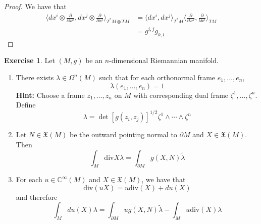 \documentclass{book}
\theoremstyle{definition}
\newtheorem{ex}[definition]{Exercise}
\newcommand{\ze}{\zeta}
\newcommand{\lam}{\lambda}
\newcommand{\Om}{\Omega}
\newcommand{\C}{\mathbb{C}}
\newcommand{\MFX}{\mathfrak{X}}
\DeclareMathOperator*{\0}{\mbf{0}}
\DeclareMathOperator*{\1}{\mbf{1}}
\renewcommand{\r}{\rangle}
\renewcommand{\l}{\langle}
\renewcommand{\div}{\text{div}}
\newcommand{\tbf}[1]{\textbf{#1}}
\newcommand{\p}{\partial}
\begin{document}
	\begin{proof}
		We have that 
		\begin{align*}
			\bigg \l dx^i \otimes \frac{\p }{\p x^k}, dx^j \otimes \frac{\p}{\p x^l} \bigg \r_{T^*M \otimes TM}
			& = \l dx^i , dx^j \r_{T^*M} \bigg \l \frac{\p }{\p x^k}, \frac{\p }{\p x^l} \bigg \r_{TM} \\
			& = g^{i,j}g_{k,l}
		\end{align*}
	\end{proof}


\begin{ex}
	Let $(M, g)$ be an $n$-dimensional Riemannian manifold.
	\begin{enumerate}
		\item There exists $\lam \in \Om^n(M)$ such that for each orthonormal frame $e_1, \ldots, e_n$, 
		$$\lam(e_1, \ldots, e_n) = 1$$
		\tbf{Hint:} Choose a frame $z_1, \ldots, z_n$ on $M$ with corresponding dual frame $\ze^1, \ldots, \ze^n$. Define $$\lam = \det [g(z_i, z_j)]^{1/2} \ze^1 \wedge \cdots \wedge \ze^n$$
		\item Let $N \in \MFX(M)$ be the outward pointing normal to $\p M$ and $X \in \MFX(M)$. Then 
		$$\int_M \div X \lam = \int_{\p M} g(X, N) \tilde{\lam}$$
		\item For each $u \in \C^{\infty}(M)$ and $X \in \MFX(M)$, we have that 
		$$\div(uX) = u \div(X) + du(X)$$ 
		and therefore
		$$\int_M du(X) \lam = \int_{\p M} u g(X, N) \tilde{\lam} - \int_{M} u \div(X) \lam$$
	\end{enumerate}
\end{ex}
\end{document}
